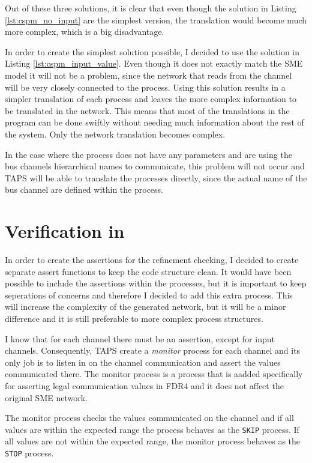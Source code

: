 Out of these three solutions, it is clear that even though the solution in Listing \ref{lst:cspm_no_input} are the simplest version, the translation would become much more complex, which is a big disadvantage.

In order to create the simplest solution possible, I decided to use the solution in Listing \ref{lst:cspm_input_value}. Even though it does not exactly match the SME model it will not be a problem, since the network that reads from the channel will be very closely connected to the process. Using this solution results in a simpler translation of each process and leaves the more complex information to be translated in the network. This means that most of the translations in the program can be done swiftly without needing much information about the rest of the system. Only the network translation becomes complex.

In the case where the process does not have any parameters and are using the bus channels hierarchical names to communicate, this problem will not occur and TAPS will be able to translate the processes directly, since the actual name of the bus channel are defined within the process.

\section{Verification in \cspm{}}
In order to create the assertions for the refinement checking, I decided to create separate assert functions to keep the code structure clean. It would have been possible to include the assertions within the processes, but it is important to keep seperations of concerns and therefore I decided to add this extra process. This will increase the complexity of the generated \cspm{} network, but it will be a minor difference and it is still preferable to more complex process structures.

I know that for each \cspm{} channel there must be an assertion, except for input channels. Consequently, TAPS create a \textit{monitor} process for each channel and its only job is to listen in on the channel communication and assert the values communicated there. The monitor process is a process that is aadded specifically for asserting legal communication values in FDR4 and it does not affect the original SME network.

The monitor process checks the values communicated on the channel and if all values are within the expected range the process behaves as the \texttt{SKIP} process. If all values are not within the expected range, the monitor process behaves as the \texttt{STOP} process.

